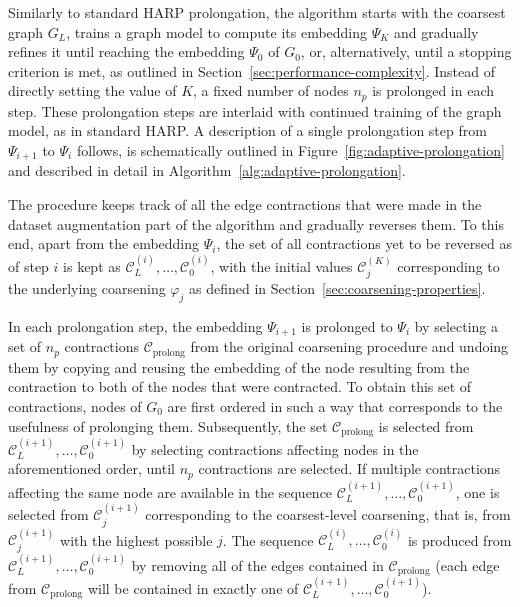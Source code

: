 \documentclass[sn-mathphys,pdflatex,iicol]{sn-jnl}%
\begin{document}
Similarly to standard HARP prolongation, the algorithm starts with the coarsest graph \( G_L \), trains a graph model to compute its embedding \( \Psi_K \) and gradually refines it until reaching the embedding \( \Psi_0 \) of \( G_0 \), or, alternatively, until a stopping criterion is met, as outlined in Section~\ref{sec:performance-complexity}. Instead of directly setting the value of \( K \), a fixed number of nodes \( n_p \) is prolonged in each step. These prolongation steps are interlaid with continued training of the graph model, as in standard HARP.  A description of a single prolongation step from \( \Psi_{i + 1} \) to \( \Psi_i \) follows, is schematically outlined in Figure~\ref{fig:adaptive-prolongation} and described in detail in Algorithm~\ref{alg:adaptive-prolongation}.

The procedure keeps track of all the edge contractions that were made in the dataset augmentation part of the algorithm and gradually reverses them. To this end, apart from the embedding \( \Psi_i \), the set of all contractions yet to be reversed as of step \( i \) is kept as \( \mathcal{C}_L^{(i)}, \dots, \mathcal{C}_0^{(i)} \), with the initial values \( \mathcal{C}_j^{(K)} \) corresponding to the underlying coarsening \( \varphi_j \) as defined in Section~\ref{sec:coarsening-properties}.

In each prolongation step, the embedding \( \Psi_{i + 1} \) is prolonged to \( \Psi_i \) by selecting a set of \( n_p \) contractions \( \mathcal{C}_\mathrm{prolong} \) from the original coarsening procedure and undoing them by copying and reusing the embedding of the node resulting from the contraction to both of the nodes that were contracted. To obtain this set of contractions, nodes of \( G_0 \) are first ordered in such a way that corresponds to the usefulness of prolonging them. Subsequently, the set \( \mathcal{C}_\mathrm{prolong} \) is selected from \( \mathcal{C}_L^{(i + 1)}, \dots, \mathcal{C}_0^{(i + 1)} \) by selecting contractions affecting nodes in the aforementioned order, until \( n_p \) contractions are selected. If multiple contractions affecting the same node are available in the sequence \( \mathcal{C}_L^{(i + 1)}, \dots, \mathcal{C}_0^{(i + 1)} \), one is selected from \( \mathcal{C}_j^{(i + 1)} \) corresponding to the coarsest-level coarsening, that is, from \( \mathcal{C}_j^{(i + 1)} \) with the highest possible \( j \). The sequence \( \mathcal{C}_L^{(i)}, \dots, \mathcal{C}_0^{(i)} \) is produced from \( \mathcal{C}_L^{(i + 1)}, \dots, \mathcal{C}_0^{(i + 1)} \) by removing all of the edges contained in \( \mathcal{C}_\mathrm{prolong} \) (each edge from \( \mathcal{C}_\mathrm{prolong} \) will be contained in exactly one of \( \mathcal{C}_L^{(i + 1)}, \dots, \mathcal{C}_0^{(i + 1)} \)).
\end{document}
